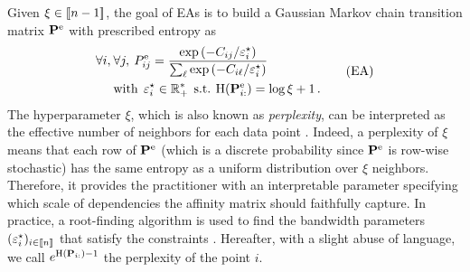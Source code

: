 Given $\xi \in {[\![n-1]\!]}$, the goal of EAs is to build a Gaussian Markov chain transition matrix $\mathbf{P}^{\mathrm{e}}$ with prescribed entropy as
\begin{equation}
\begin{split}
    \forall i, \: &\forall j, \: P^{\mathrm{e}}_{ij} = \frac{\exp{(-C_{ij}/\varepsilon^\star_i)}}{\sum_\ell \exp{(-C_{i\ell}/\varepsilon^\star_i)}} \\
    &\text{with} \:\: \varepsilon^\star_i \in \mathbb{R}^*_+ \:\: \text{s.t.} \: \operatorname{H}(\mathbf{P}^{\mathrm{e}}_{i:}) = \log{\xi} + 1\,. \label{eq:entropic_affinity_pb}
\end{split}\tag{EA}
\end{equation}
The hyperparameter $\xi$, which is also known as \emph{perplexity}, can be interpreted as the effective number of neighbors for each data point \cite{vladymyrov2013entropic}. Indeed, a perplexity of $\xi$ means that each row of $\mathbf{P}^{\mathrm{e}}$ (which is a discrete probability since $\mathbf{P}^{\mathrm{e}}$ is row-wise stochastic) has the same entropy as a uniform distribution over $\xi$ neighbors. Therefore, it provides the practitioner with an interpretable parameter specifying which scale of dependencies the affinity matrix should faithfully capture. In practice, a root-finding algorithm is used to find the bandwidth parameters $(\varepsilon_i^\star)_{i \in {[\![n]\!]}}$ that satisfy the constraints \cite{vladymyrov2013entropic}. Hereafter, with a slight abuse of language, we call $e^{\operatorname{H}(\mathbf{P}_{i:})-1}$ the perplexity of the point $i$.

